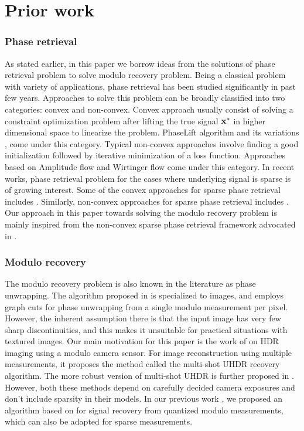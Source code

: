 \section{Prior work}
\label{sec:prior}

\subsubsection*{Phase retrieval} As stated earlier, in this paper we borrow ideas from the solutions of phase retrieval problem to solve modulo recovery problem. Being a classical problem with variety of applications, phase retrieval has been studied significantly in past few years. Approaches to solve this problem can be broadly classified into two categories: convex and non-convex. 
Convex approach usually consist of solving a constraint optimization problem after lifting the true signal $\mathbf{x^*}$ in higher dimensional space to linearize the problem. PhaseLift algorithm \cite{candes2013phaselift} and its variations \cite{gross2017improved}, \cite{candes2015phase} come under this category. Typical non-convex approaches involve finding a good initialization followed by iterative minimization of a loss function. Approaches based on Amplitude flow \cite{wang2016sparse,wang2016solving} and Wirtinger flow \cite{candes2015phase, zhang2016reshaped,  chen2015solving, cai2016optimal} come under this category. 
In recent works, phase retrieval problem for the cases where underlying signal is sparse is of growing interest. Some of the convex approaches for sparse phase retrieval includes \cite{ohlsson2012cprl, li2013sparse,bahmani2015efficient,jaganathan2012recovery} \todo{} . Similarly, non-convex approaches for sparse phase retrieval includes \cite{netrapalli2013phase, cai2016optimal, wang2016sparse}. Our approach in this paper towards solving the modulo recovery problem is mainly inspired from the non-convex sparse phase retrieval framework advocated in \cite{Jagatap2017}. 

\subsubsection*{Modulo recovery} The modulo recovery problem is also known in the literature
as phase unwrapping. The algorithm proposed in \cite{bioucas2007phase} is specialized to images, and employs graph cuts for phase unwrapping from a single modulo measurement per pixel. However, the inherent assumption there is that the input image has very few sharp discontinuities, and this makes it unsuitable for practical situations with textured images. Our main motivation for this paper is the work of \cite{ICCP15_Zhao} on HDR imaging using a modulo camera sensor. For image reconstruction using multiple measurements, it proposes the method called the multi-shot UHDR recovery algorithm. The more robust version of multi-shot UHDR is further proposed in \cite{Lang2017}. However, both these methods depend on carefully decided camera exposures and don't include sparsity in their models. In our previous work \cite{Shah}, we proposed an algorithm based on \cite{ICCP15_Zhao, soltani2017stable} for signal recovery from quantized modulo measurements, which can also be adapted for sparse measurements. 

